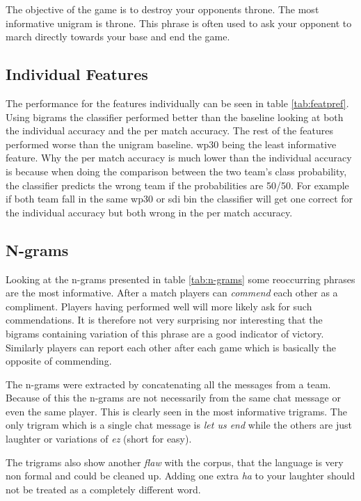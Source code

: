 \documentclass[12pt,a4paper]{article}
\begin{document}
The objective of the game is to destroy your opponents throne. The most informative unigram is throne.
This phrase is often used to ask your opponent to march directly towards your base and end the game.


\subsection{Individual Features}
The performance for the features individually can be seen in table \ref{tab:featpref}.
Using bigrams the classifier performed better than the baseline looking at both the individual accuracy
and the per match accuracy.
The rest of the features performed worse than the unigram baseline.
wp30 being the least informative feature.
Why the per match accuracy is much lower than the individual accuracy is because when
doing the comparison between the two team's class probability, the classifier predicts the
wrong team if the probabilities are 50/50.
For example if both team fall in the same wp30 or sdi bin the classifier will get one correct
for the individual accuracy but both wrong in the per match accuracy.

\subsection{N-grams}
Looking at the n-grams presented in table \ref{tab:n-grams} some reoccurring phrases are the most informative.
After a match players can \textit{commend} each other as a compliment.
Players having performed well will more likely ask for such commendations.
It is therefore not very surprising nor interesting that the bigrams containing variation of this phrase
are a good indicator of victory.
Similarly players can report each other after each game which is basically the opposite of commending.

The n-grams were extracted by concatenating all the messages from a team.
Because of this the n-grams are not necessarily from the same chat message or even the same player.
This is clearly seen in the most informative trigrams.
The only trigram which is a single chat message is \textit{let us end} while the others are just
laughter or variations of \textit{ez} (short for easy).

The trigrams also show another \textit{flaw} with the corpus, that the language is very non formal and
could be cleaned up. Adding one extra \textit{ha} to your laughter should not be treated
as a completely different word.
\end{document}
